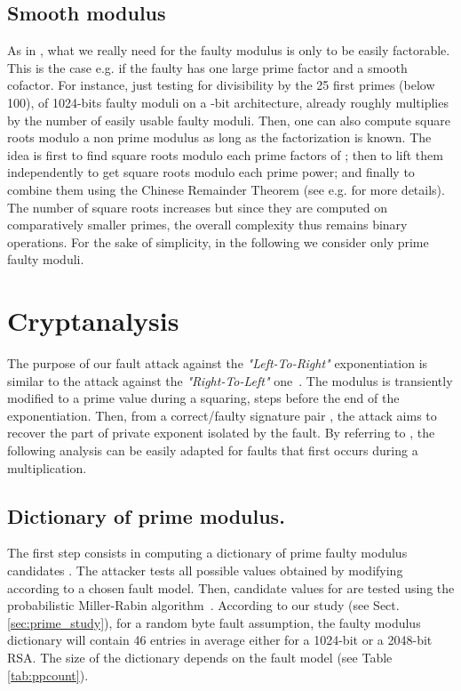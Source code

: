 \documentclass{article}
\begin{document}
\subsection{Smooth modulus}
As in \cite{13}, what we really need for the faulty modulus is only to
be easily factorable. This is the case e.g. if the faulty 
has one large prime factor and a smooth cofactor.
For instance, just testing for divisibility by the 25 first primes
(below 100), of 1024-bits faulty moduli on a -bit architecture,
already roughly multiplies by  the number of easily usable faulty
moduli. 
Then, one can also compute square roots modulo a
non prime modulus as long as the factorization is known. The idea is
first to find square roots modulo each prime factors of
; then to lift them independently to get square roots modulo
each prime power; and finally to combine them using the Chinese
Remainder Theorem (see e.g. \cite[\S 13.3.3]{83} for more details). 
The number of square roots increases but since they are computed on
comparatively smaller primes, the overall complexity thus remains
 binary operations. 
For the sake of simplicity, in the following
we consider only prime faulty moduli.

\section{Cryptanalysis}
\label{sec:crypt}
The purpose of our fault attack against the \textit{"Left-To-Right"} exponentiation is similar to the attack against the \textit{"Right-To-Left"} one~\cite{77}. The modulus  is transiently modified to a prime value during a squaring,  steps before the end of the exponentiation. Then, from a correct/faulty signature pair , the attack aims to recover the part of private exponent  isolated by the fault. By referring to \cite{77}, the following analysis can be easily adapted for faults that first occurs during a multiplication.

\subsection{Dictionary of prime modulus.}
The first step consists in computing a dictionary of prime faulty modulus candidates . The attacker tests all possible values obtained by modifying  according to a chosen fault model. Then, candidate values for  are tested using the probabilistic Miller-Rabin algorithm~\cite{81}. According to our study (see Sect. \ref{sec:prime_study}), for a random byte fault assumption, the faulty modulus dictionary will contain 46 entries in average either for a 1024-bit or a 2048-bit RSA. The size of the dictionary depends on the fault model (see Table \ref{tab:ppcount}).
\end{document}

